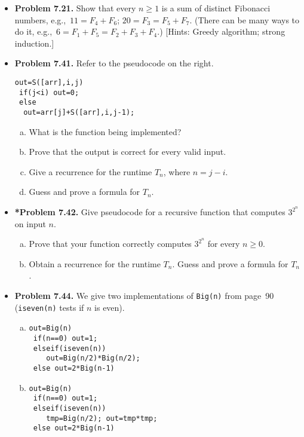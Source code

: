 \documentclass[11pt]{article}
\begin{document}
\begin{itemize}
\vspace{0.1in}

\item \textbf{Problem 7.21.}
Show that every $n\ge 1$ is a sum of distinct Fibonacci numbers,
e.g.,~$11=F_4+F_6$; $20=F_3=F_5+F_7$.
(There can be many ways to do it, e.g.,~$6=F_1+F_5=F_2+F_3+F_4$.)
[Hints: Greedy algorithm; strong induction.]

\vspace{0.1in}

\item \textbf{Problem 7.41.}
Refer to the pseudocode on the right.
\begin{verbatim}
out=S([arr],i,j)
 if(j<i) out=0;
 else
  out=arr[j]+S([arr],i,j-1);
\end{verbatim}
\begin{enumerate}[(a)]
\item What is the function being implemented?
\item Prove that the output is correct for every valid input.
\item Give a recurrence for the runtime $T_n$, where $n=j-i$.
\item Guess and prove a formula for $T_n$.
\end{enumerate}

\vspace{0.1in}

\item \textbf{*Problem 7.42.}
Give pseudocode for a recursive function that computes $3^{2^n}$ on input $n$.
\begin{enumerate}[(a)]
\item Prove that your function correctly computes $3^{2^n}$ for every $n\ge 0$.
\item Obtain a recurrence for the runtime $T_n$.
  Guess and prove a formula for $T_n$.
\end{enumerate}

\vspace{0.1in}

\item \textbf{Problem 7.44.}
We give two implementations of \verb+Big(n)+ from page~90
(\verb+iseven(n)+ tests if $n$ is even).
\begin{multicols}{2}
\begin{enumerate}[(a)]
\item
\begin{verbatim}
out=Big(n)
 if(n==0) out=1;
 elseif(iseven(n))
    out=Big(n/2)*Big(n/2);
 else out=2*Big(n-1)
\end{verbatim}
\item
\begin{verbatim}
out=Big(n)
 if(n==0) out=1;
 elseif(iseven(n))
    tmp=Big(n/2); out=tmp*tmp;
 else out=2*Big(n-1)
\end{verbatim}
\end{enumerate}
\end{multicols}


\end{itemize}
\end{document}
